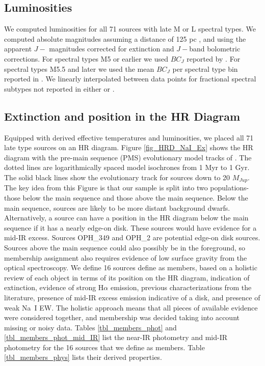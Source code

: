 \subsection{Luminosities}
We computed luminosities for all 71 sources with late M or L spectral types.  We computed absolute magnitudes assuming a distance of 125 pc \citep{2008ApJ...675L..29L}, and using the apparent $J-$ magnitudes corrected for extinction and $J-$band bolometric corrections.  For spectral types M5 or earlier we used $BC_J$ reported by \citep{2013ApJS..208....9P}.  For spectral types M5.5 and later we used the mean $BC_J$ per spectral type bin reported in \citet{2002AJ....124.1170D}.  We linearly interpolated between data points for fractional spectral subtypes not reported in either \citet{2002AJ....124.1170D} or \citet{2013ApJS..208....9P}.


\subsection{Extinction and position in the HR Diagram}
\label{sec_HRD}
Equipped with derived effective temperatures and luminosities, we placed all 71 late type sources on an HR diagram.  Figure \ref{fig_HRD_NaI_Ex} shows the HR diagram with the pre-main sequence (PMS) evolutionary model tracks of \citep{1998A&A...337..403B,2002A&A...382..563B}.  The dotted lines are logarithmically spaced model isochrones from 1 Myr to 1 Gyr.  The solid black lines show the evolutionary track for sources down to 20 $M_{Jup}$.  The key idea from this Figure is that our sample is split into two populations- those below the main sequence and those above the main sequence.  Below the main sequence, sources are likely to be more distant background dwarfs.  Alternatively, a source can have a position in the HR diagram below the main sequence if it has a nearly edge-on disk.  These sources would have evidence for a mid-IR excess.  Sources OPH\_349 and OPH\_2 are potential edge-on disk sources.  Sources above the main sequence could also possibly be in the foreground, so membership assignment also requires evidence of low surface gravity from the optical spectroscopy.  We define 16 sources define as members, based on a holistic review of each object in terms of its position on the HR diagram, indication of extinction, evidence of strong H$\alpha$ emission, previous characterizations from the literature, presence of mid-IR excess emission indicative of a disk, and presence of weak Na~I EW.  The holistic approach means that all pieces of available evidence were considered together, and membership was decided taking into account missing or noisy data.  Tables \ref{tbl_members_phot} and \ref{tbl_members_phot_mid_IR} list the near-IR photometry and mid-IR photometry for the 16 sources that we define as members.  Table \ref{tbl_members_phys} lists their derived properties.

